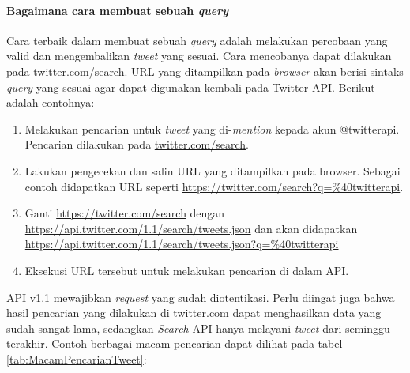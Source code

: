 \paragraph{Bagaimana cara membuat sebuah \textit{query}}
Cara terbaik dalam membuat sebuah \textit{query} adalah melakukan percobaan yang valid dan mengembalikan \textit{tweet} yang sesuai. Cara mencobanya dapat dilakukan pada \url{twitter.com/search}. URL yang ditampilkan pada \textit{browser} akan berisi sintaks \textit{query} yang sesuai agar dapat digunakan kembali pada Twitter API. Berikut adalah contohnya:

\begin{enumerate}
	\item Melakukan pencarian untuk \textit{tweet} yang di-\textit{mention} kepada akun @twitterapi. Pencarian dilakukan pada \url{twitter.com/search}.
	\item Lakukan pengecekan dan salin URL yang ditampilkan pada browser. Sebagai contoh didapatkan URL seperti \url{https://twitter.com/search?q=\%40twitterapi}.
	\item Ganti \url{https://twitter.com/search} dengan \url{https://api.twitter.com/1.1/search/tweets.json} dan akan didapatkan \url{https://api.twitter.com/1.1/search/tweets.json?q=\%40twitterapi}
	\item Eksekusi URL tersebut untuk melakukan pencarian di dalam API.
\end{enumerate}

API v1.1 mewajibkan \textit{request} yang sudah diotentikasi. Perlu diingat juga bahwa hasil pencarian yang dilakukan di \url{twitter.com} dapat menghasilkan data yang sudah sangat lama, sedangkan \textit{Search} API hanya melayani \textit{tweet} dari seminggu terakhir. Contoh berbagai macam pencarian dapat dilihat pada tabel \ref{tab:MacamPencarianTweet}:

